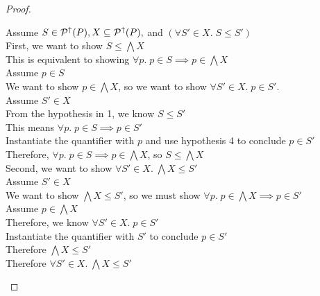 \begin{proof}
\begin{tabbedproof}
\oo Assume $S \in \mathcal{P}^{\uparrow}({P}), X \subseteq \mathcal{P}^{\uparrow}({P}),$ and   
           $(\forall S' \in X.\; S \leq S')$ \\
\ooo First, we want to show $S \leq \bigwedge X$ \\
\oooo This is equivalent to showing $\forall p.\; p \in S \implies p \in \bigwedge X$ \\
\oooo Assume $p \in S$ \\
\ooooo We want to show $p \in \bigwedge X$, so we want to show $\forall S' \in X.\; p \in S'$. \\
\ooooo Assume $S' \in X$ \\
\oooooo From the hypothesis in 1, we know $S \leq S'$ \\
\oooooo This means $\forall p.\; p \in S \implies p \in S'$ \\
\oooooo Instantiate the quantifier with $p$ and use hypothesis 4 to conclude $p \in S'$ \\
\oooo Therefore, $\forall p.\; p \in S \implies p \in \bigwedge X$, so $S \leq \bigwedge X$ \\[1em]
\ooo Second, we want to show $\forall S' \in X.\; \bigwedge X \leq S'$ \\
\ooo Assume $S' \in X$ \\
\oooo We want to show $\bigwedge X \leq S'$, so we must show $\forall p.\; p \in \bigwedge X \implies p \in S'$ \\
\oooo Assume $p \in \bigwedge X$ \\
\ooooo Therefore, we know $\forall S' \in X.\; p \in S'$ \\
\ooooo Instantiate the quantifier with $S'$ to conclude $p \in S'$ \\
\oooo Therefore $\bigwedge X \leq S'$ \\
\ooo Therefore $\forall S' \in X.\; \bigwedge X \leq S'$ \\
\end{tabbedproof}
\end{proof}



